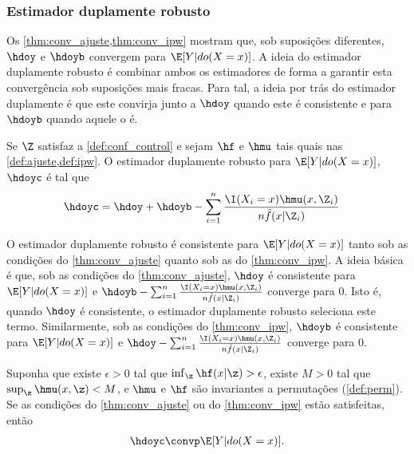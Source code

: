 \subsubsection{Estimador duplamente robusto}

Os \cref{thm:conv_ajuste,thm:conv_ipw} mostram que,
sob suposições diferentes, 
$\hdoy$ e $\hdoyb$ convergem para $\E[Y|do(X=x)]$.
A ideia do estimador duplamente robusto é
combinar ambos os estimadores de forma
a garantir esta convergência sob 
suposições mais fracas.
Para tal, a ideia por trás do 
estimador duplamente é que
este convirja junto a $\hdoy$ 
quando este é consistente e
para $\hdoyb$ quando aquele o é.

\begin{definition}
 Se $\Z$ satisfaz a \cref{def:conf_control} e 
 sejam $\hf$ e $\hmu$ tais quais nas
 \cref{def:ajuste,def:ipw}.
 O estimador duplamente robusto para
 $\E[Y|do(X=x)]$, $\hdoyc$ é tal que
 \label{def:duplo_robusto}
 \begin{align*}
  \hdoyc 
  &= \hdoy + \hdoyb 
  - \sum_{i=1}^n \frac{\I(X_i=x)\hmu(x,\Z_i)}{n\hat{f}(x|\Z_i)}
 \end{align*}
\end{definition}

O estimador duplamente robusto é consistente para
$\E[Y|do(X=x)]$ tanto sob as condições do
\cref{thm:conv_ajuste} quanto sob as do
\cref{thm:conv_ipw}. A ideia básica é que,
sob as condições do \cref{thm:conv_ajuste},
$\hdoy$ é consistente para $\E[Y|do(X=x)]$ e
$\hdoyb - \sum_{i=1}^n \frac{\I(X_i=x)\hmu(x,\Z_i)}{n\hat{f}(x|\Z_i)}$
converge para $0$. Isto é,
quando $\hdoy$ é consistente,
o estimador duplamente robusto seleciona este termo.
Similarmente, sob as condições do \cref{thm:conv_ipw},
$\hdoyb$ é consistente para $\E[Y|do(X=x)]$ e
$\hdoy - \sum_{i=1}^n \frac{\I(X_i=x)\hmu(x,\Z_i)}{n\hat{f}(x|\Z_i)}$
converge para $0$.

\begin{theorem}
 \label{thm:conv_duplo_robusto}
 Suponha que existe $\epsilon > 0$ tal que
 $\inf_\z \hf(x|\z) > \epsilon$,
 existe $M > 0$ tal que 
 $\sup_\z \hmu(x,\z) < M$, e
 $\hmu$ e $\hf$ são invariantes 
 a permutações (\cref{def:perm}).
 Se as condições do \cref{thm:conv_ajuste} ou
 do \cref{thm:conv_ipw} estão satisfeitas, então
 \begin{align*}
  \hdoyc \convp \E[Y|do(X=x)].
 \end{align*}
\end{theorem}

